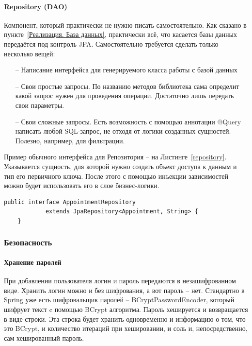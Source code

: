 \documentclass[a4paper,article]{article}
\begin{document}
    \paragraph{Repository (DAO)}\label{Реализация. Сервер. Repository}
    
    Компонент, который практически не нужно писать самостоятельно. Как сказано в пункте~\ref{Реализация. База данных}, практически всё, что касается базы данных передаётся под контроль JPA. Самостоятельно требуется сделать только несколько вещей:
    
    \begin{itemize}[nolistsep]
        \item[--] Написание интерфейса для генерируемого класса работы с базой данных
        \item[--] Свои простые запросы. По названию методов библиотека сама определит какой запрос нужен для проведения операции. Достаточно лишь передать свои параметры.
        \item[--] Свои сложные запросы. Есть возможность с помощью аннотации @Query написать любой SQL-запрос, не отходя от логики созданных сущностей. Полезно, например, для фильтрации.
    \end{itemize}
    
    Пример обычного интерфейса для Репозитория -- на Листинге~\ref{repository}. Указывается сущность, для которой нужно создать объект доступа к данным и тип его первичного ключа. После этого с помощью инъекции зависимостей можно будет использовать его в слое бизнес-логики.
    
    \begin{lstlisting}[label=repository,caption=Пример интерфейса для репозитория]
    public interface AppointmentRepository 
            extends JpaRepository<Appointment, String> {
    }
    \end{lstlisting}

    \subsubsection{Безопасность}\label{Реализация. Сервер. Безопасность}
    
    \paragraph{Хранение паролей}
    
    При добавлении пользователя логин и пароль передаются в незашифрованном виде. Хранить логин можно и без шифрования, а вот пароль -- нет. Стандартно в Spring уже есть шифровальщик паролей -- BCryptPasswordEncoder, который шифрует текст c помощью BCrypt алгоритма. Пароль хешируется и возвращается в виде строки. Эта строка будет хранить одновременно и информацию о том, что это BCrypt, и количество итераций при хешировании, и соль и, непосредственно, сам хешированный пароль.
    
\end{document}
